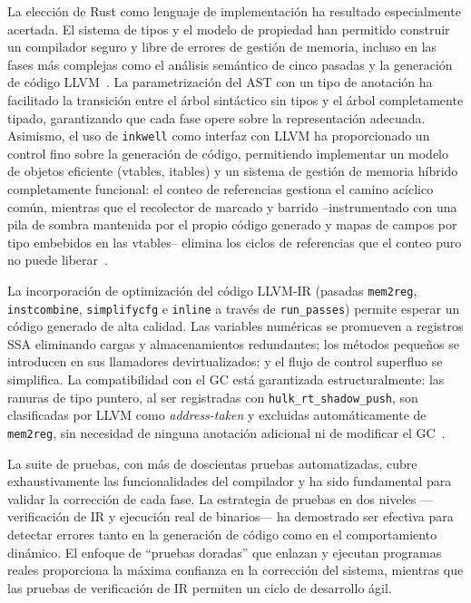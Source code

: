 \documentclass[12pt, a4paper]{article}
\begin{document}
La elección de Rust como lenguaje de implementación ha resultado especialmente acertada. El sistema de tipos y el modelo de propiedad han permitido construir un compilador seguro y libre de errores de gestión de memoria, incluso en las fases más complejas como el análisis semántico de cinco pasadas y la generación de código LLVM~\cite{lattner2004}. La parametrización del AST con un tipo de anotación ha facilitado la transición entre el árbol sintáctico sin tipos y el árbol completamente tipado, garantizando que cada fase opere sobre la representación adecuada. Asimismo, el uso de \texttt{inkwell} como interfaz con LLVM ha proporcionado un control fino sobre la generación de código, permitiendo implementar un modelo de objetos eficiente (vtables, itables) y un sistema de gestión de memoria híbrido completamente funcional: el conteo de referencias gestiona el camino acíclico común, mientras que el recolector de marcado y barrido --instrumentado con una pila de sombra mantenida por el propio código generado y mapas de campos por tipo embebidos en las vtables-- elimina los ciclos de referencias que el conteo puro no puede liberar~\cite{baconrajan2004,jones2011}.

La incorporación de optimización del código LLVM-IR (pasadas \texttt{mem2reg}, \texttt{instcombine}, \texttt{simplifycfg} e \texttt{inline} a través de \texttt{run\_passes}) permite esperar un código generado de alta calidad. Las variables numéricas se promueven a registros SSA eliminando cargas y almacenamientos redundantes; los métodos pequeños se introducen en sus llamadores devirtualizados; y el flujo de control superfluo se simplifica. La compatibilidad con el GC está garantizada estructuralmente: las ranuras de tipo puntero, al ser registradas con \texttt{hulk\_rt\_shadow\_push}, son clasificadas por LLVM como \textit{address-taken} y excluidas automáticamente de \texttt{mem2reg}, sin necesidad de ninguna anotación adicional ni de modificar el GC~\cite{allen2001}.

La suite de pruebas, con más de doscientas pruebas automatizadas, cubre exhaustivamente las funcionalidades del compilador y ha sido fundamental para validar la corrección de cada fase. La estrategia de pruebas en dos niveles —verificación de IR y ejecución real de binarios— ha demostrado ser efectiva para detectar errores tanto en la generación de código como en el comportamiento dinámico. El enfoque de ``pruebas doradas'' que enlazan y ejecutan programas reales proporciona la máxima confianza en la corrección del sistema, mientras que las pruebas de verificación de IR permiten un ciclo de desarrollo ágil.
\end{document}
